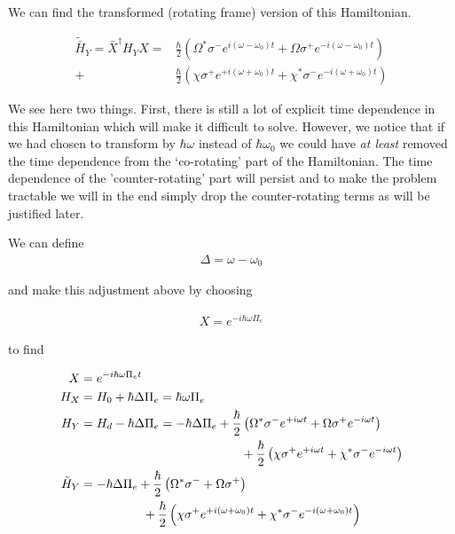 \documentclass[12pt]{article}
\begin{document}
We can find the transformed (rotating frame) version of this Hamiltonian.

\begin{align}
\tilde{\bar{H}}_Y = \bar{X}^{\dag} H_Y X = &\frac{\hbar}{2}\left(\Omega^* \sigma^- e^{i(\omega - \omega_0)t} + \Omega \sigma^+ e^{-i(\omega - \omega_0)t} \right)\\
+ &\frac{\hbar}{2}\left( \chi\sigma^+e^{+i(\omega+\omega_0) t} + \chi^* \sigma^-e^{-i(\omega+\omega_0) t} \right)
\end{align}

We see here two things. First, there is still a lot of explicit time dependence in this Hamiltonian which will make it difficult to solve. However, we notice that if we had chosen to transform by $\hbar \omega$ instead of $\hbar \omega_0$ we could have \textit{at least} removed the time dependence from the `co-rotating' part of the Hamiltonian. The time dependence of the 'counter-rotating' part will persist and to make the problem tractable we will in the end simply drop the counter-rotating terms as will be justified later.

We can define 
\begin{align}
\Delta = \omega-\omega_0
\end{align}

and make this adjustment above by choosing 

\begin{align}
X = e^{-i\hbar \omega \Pi_e}
\end{align}

to find

\begin{align}
X &= e^{-i\hbar\omega \Pi_e t}\\
H_X &= H_0 +\hbar\Delta \Pi_e= \hbar\omega \Pi_e \\
H_Y &= H_d -\hbar \Delta \Pi_e = 
-\hbar\Delta \Pi_e + \frac{\hbar}{2}\left(\Omega^*\sigma^- e^{+i\omega t} + \Omega\sigma^+ e^{-i\omega t} \right)\\
&\hspace{1.8in} +\frac{\hbar}{2}\left( \chi\sigma^+e^{+i\omega t} + \chi^* \sigma^-e^{-i\omega t} \right)\\
\tilde{H}_Y & = 
-\hbar\Delta \Pi_e + \frac{\hbar}{2}\left(\Omega^* \sigma^- + \Omega \sigma^+ \right)\\
&\hspace{.7 in} +\frac{\hbar}{2}\left( \chi\sigma^+e^{+i(\omega+\omega_0) t} + \chi^* \sigma^-e^{-i(\omega+\omega_0) t} \right)\\
\end{align}
\end{document}
